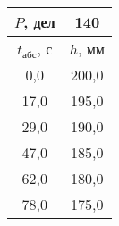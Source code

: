 \begin{tabular}[t]{|c|c|}
\hline
$P$, дел & 140 \\
\hline
$t_{абс}$, с & $h$, мм \\ 
\hline
0,0 & 200,0 \\ 
17,0 & 195,0 \\ 
29,0 & 190,0 \\ 
47,0 & 185,0 \\ 
62,0 & 180,0 \\ 
78,0 & 175,0 \\ 
\hline
\end{tabular}